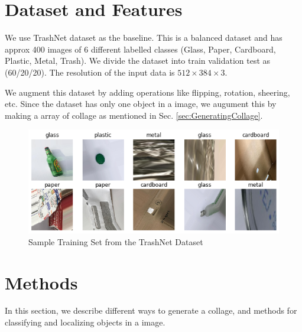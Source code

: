 \documentclass{article}
\begin{document}



\section{Dataset and Features}
We use TrashNet \citep{yang2016classification} dataset as the baseline. This is a balanced dataset and has approx 400 images of 6 different labelled classes (Glass, Paper, Cardboard, Plastic, Metal, Trash).  We divide the dataset into train \/ validation \/ test as (60/20/20). The resolution of the input data is $512 \times 384 \times 3$.

We augment this dataset by adding operations like flipping, rotation, sheering, etc.  Since the dataset has only one object in a image, we augument this by making a array of collage as mentioned in Sec. \ref{sec:GeneratingCollage}. 

\begin{figure}[h!]
    \centering
    \includegraphics[width=\linewidth]{data/images/03_Dataset/train_sample.png}
    \caption{Sample Training Set from the TrashNet Dataset \cite{yang2016classification}}
    \label{fig:TrainSample}
\end{figure}

\section{ Methods }
In this section, we describe different ways to generate a collage, and methods for classifying and localizing objects in a image. 
\end{document}
